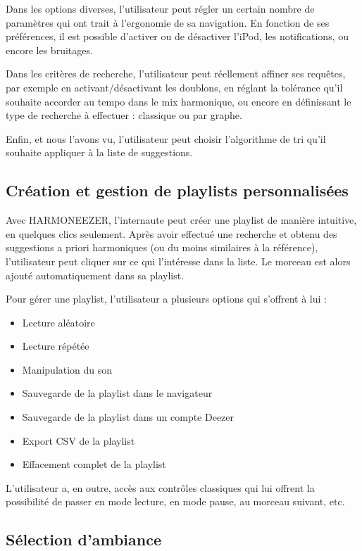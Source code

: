 \documentclass[a4paper,12pt]{article}
\begin{document}
Dans les options diverses, l'utilisateur peut régler un certain nombre de paramètres qui ont trait à l'ergonomie de sa navigation. En fonction de ses préférences, il est possible d'activer ou de désactiver l'iPod, les notifications, ou encore les bruitages.

Dans les critères de recherche, l'utilisateur peut réellement affiner ses requêtes, par exemple en activant/désactivant les doublons, en réglant la tolérance qu'il souhaite accorder au tempo dans le mix harmonique, ou encore en définissant le type de recherche à effectuer : classique ou par graphe.

Enfin, et nous l'avons vu, l'utilisateur peut choisir l'algorithme de tri qu'il souhaite appliquer à la liste de suggestions.

\subsection{Création et gestion de playlists personnalisées}

Avec HARMONEEZER, l'internaute peut créer une playlist de manière intuitive, en quelques clics seulement. Après avoir effectué une recherche et obtenu des suggestions a priori harmoniques (ou du moins similaires à la référence), l'utilisateur peut cliquer sur ce qui l'intéresse dans la liste. Le morceau est alors ajouté automatiquement dans sa playlist.

Pour gérer une playlist, l'utilisateur a plusieurs options qui s'offrent à lui :

\begin{itemize}
 \item{Lecture aléatoire}
 \item{Lecture répétée}
 \item{Manipulation du son}
 \item{Sauvegarde de la playlist dans le navigateur}
 \item{Sauvegarde de la playlist dans un compte Deezer}
 \item{Export CSV de la playlist}
 \item{Effacement complet de la playlist}
\end{itemize}

L'utilisateur a, en outre, accès aux contrôles classiques qui lui offrent la possibilité de passer en mode lecture, en mode pause, au morceau suivant, etc.

\subsection{Sélection d'ambiance}
\end{document}
